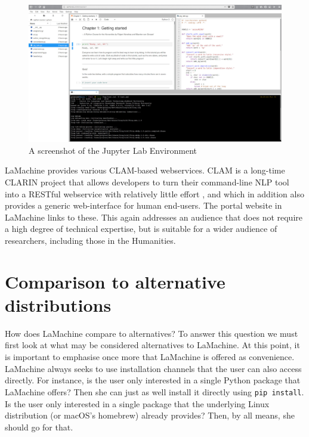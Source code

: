 \documentclass[a4paper,11pt]{article}
\begin{document}
\begin{figure}[htb] \begin{center}
\includegraphics[width=135.0mm]{screenshot_lab.jpg}
\end{center}
\caption{\footnotesize{A screenshot of the Jupyter Lab Environment}}
\label{fig:lab}
\end{figure}

LaMachine provides various CLAM-based webservices. CLAM is a long-time CLARIN project that allows developers to turn
their command-line NLP tool into a RESTful webservice with relatively little effort \cite{CLAMPAPER}, and which in
addition also provides a generic web-interface for human end-users. The portal website in LaMachine links to these. This
again addresses an audience that does not require a high degree of technical expertise, but is suitable for a wider
audience of researchers, including those in the Humanities.

\section{Comparison to alternative distributions}\label{sec:comparison}

How does LaMachine compare to alternatives? To answer this question we must first look at what may be considered
alternatives to LaMachine. At this point, it is important to emphasise once more that LaMachine is offered as convenience.
LaMachine always seeks to use installation channels that the user can also access directly. For instance, is the user
only interested in a single Python package that LaMachine offers? Then she can just as well install it directly using
\texttt{pip install}. Is the user only interested in a single package that  the underlying Linux distribution (or
macOS's homebrew)
already provides? Then, by all means, she should go for that.
\end{document}
